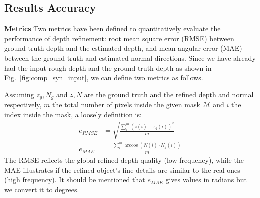 \subsection{Results Accuracy}
\textbf{Metrics}
Two metrics have been defined to quantitatively evaluate the performance of depth refinement: root mean square error (RMSE) between ground truth depth and the estimated depth, and mean angular error (MAE) between the ground truth and estimated normal directions.
Since we have already had the input rough depth and the ground truth depth as shown in Fig.~\ref{fig:comp_syn_input}, we can define two metrics as follows.

Assuming $z_g, N_g$ and $z, N$ are the ground truth and the refined depth and normal respectively, $m$ the total number of pixels inside the given mask $\mathcal{M}$ and $i$ the index inside the mask, a loosely definition is: 
\begin{align}
    e_{RMSE} &= \sqrt{\frac{\sum\limits_{i}^{m}{(z(i) - z_g(i))^2}}{m}}\\
    e_{MAE} &= \frac{\sum\limits_{i}^{m} \arccos (N(i) \cdot N_g(i))}{m}
\end{align}
The RMSE reflects the global refined depth quality (low frequency), while the MAE illustrates if the refined object's fine details are similar to the real ones (high frequency). 
It should be mentioned that $e_{MAE}$ gives values in radians but we convert it to degrees.

